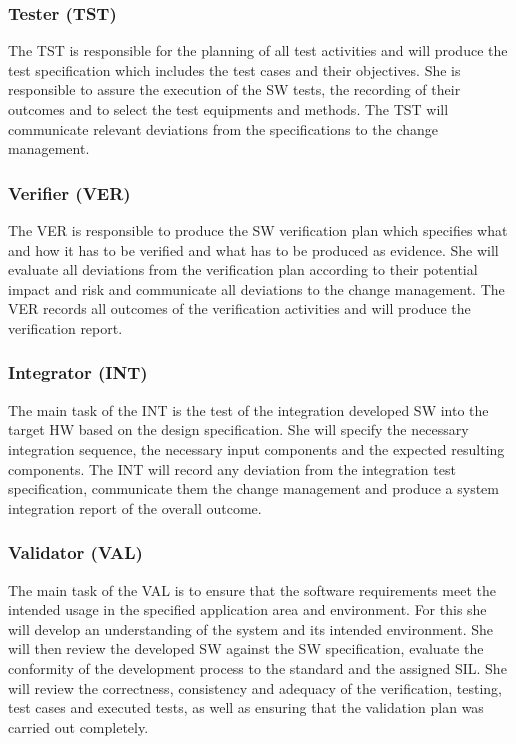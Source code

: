\subsubsection{Tester (TST)}
\label{sec:tester}

The TST is responsible for the planning of all test activities and will produce
the test specification which includes the test cases and their objectives. She
is responsible to assure the execution of the SW tests, the recording of their
outcomes and to select the test equipments and methods. The TST will communicate
relevant deviations from the specifications to the change management.

\subsubsection{Verifier (VER)}
\label{sec:verifier}

The VER is responsible to produce the SW verification plan which specifies what
and how it has to be verified and what has to be produced as evidence. She will
evaluate all deviations from the verification plan according to their potential
impact and risk and communicate all deviations to the change management. The VER
records all outcomes of the verification activities and will produce the
verification report.

\subsubsection{Integrator (INT)}
\label{sec:integrator}

The main task of the INT is the test of the integration developed SW into the
target HW based on the design specification. She will specify the necessary
integration sequence, the necessary input components and the expected resulting
components. The INT will record any deviation from the integration test
specification, communicate them the change management and produce a system
integration report of the overall outcome.

\subsubsection{Validator (VAL)}
\label{sec:validator}

The main task of the VAL is to ensure that the software requirements meet the
intended usage in the specified application area and environment. For this she
will develop an understanding of the system and its intended environment. She
will then review the developed SW against the SW specification, evaluate the
conformity of the development process to the standard and the assigned SIL. She
will review the correctness, consistency and adequacy of the verification,
testing, test cases and executed tests, as well as ensuring that the validation
plan was carried out completely.

